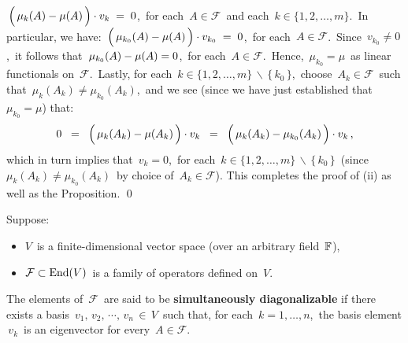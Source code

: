 \begin{enumerate}
    \,$
    \left(\,
            \mu_{k}(A) \overset{{\color{white}.}}{-} \mu(A)
            \,\right)
        \cdot
        v_{k}
    \; = \;
        0
    $,\,
    for each \,$A \in \mathcal{F}$\, and each \,$k \in \{1,2,\ldots,m\}$.\,
    \vskip 0.1cm
    In particular, we have:
    \,$
    \left(\,
            \mu_{k_{0}}(A) \overset{{\color{white}.}}{-} \mu(A)
            \,\right)
        \cdot
        v_{k_{0}}
    \; = \;
        0
    $,\,
    for each \,$A \in \mathcal{F}$.\,
    Since \,$v_{k_{0}} \neq 0$,\, it follows that
    \,$\mu_{k_{0}}(A) \overset{{\color{white}.}}{-} \mu(A) = 0$,\,
    for each \,$A \in \mathcal{F}$.\,
    Hence, \,$\mu_{k_{0}} = \mu$\, as linear functionals on \,$\mathcal{F}$.\,
    \vskip 0.1cm
    Lastly, for each \,$k \in \{1,2,\ldots,m\} \,\backslash\, \{\,k_{0}\,\}$,\,
    choose \,$A_{k} \in \mathcal{F}$\, such that
    \,$\mu_{k}(A_{k}) \neq \mu_{k_{0}}(A_{k})$,\,
    and we see (since we have just established that $\mu_{k_{0}} = \mu$) that:
    \begin{equation*}
    0
    \;\; = \;\;
	    \left(\,
	            \mu_{k}(A_{k}) \overset{{\color{white}.}}{-} \mu(A_{k})
	            \,\right)
	        \cdot
	        v_{k}
    \;\; = \;\;
	    \left(\,
	            \mu_{k}(A_{k}) \overset{{\color{white}.}}{-} \mu_{k_{0}}(A_{k})
	            \,\right)
	        \cdot
	        v_{k}\,,
    \end{equation*}
    which in turn implies that \,$v_{k} = 0$,\,
    for each \,$k \in \{1,2,\ldots,m\} \,\backslash\, \{\,k_{0}\,\}$\,
    (since \,$\mu_{k}(A_{k}) \neq \mu_{k_{0}}(A_{k})$\, by choice of \,$A_{k} \in \mathcal{F}$).
    \vskip 0.2cm
    \noindent
    This completes the proof of (ii) as well as the Proposition.
    \qed
\end{enumerate}


\vskip 0.5cm
\begin{definition}
\mbox{}
\vskip 0.05cm
\noindent
Suppose:
\begin{itemize}
\item
    $V$\, is a finite-dimensional vector space (over an arbitrary field \,$\mathbb{F}$),
\item
    $\mathcal{F} \subset \textnormal{End}(V)$\, is a family of operators defined on \,$V$.
\end{itemize}
The elements of \,$\mathcal{F}$\, are said to be \textbf{simultaneously diagonalizable}
if there exists a basis \,$v_{1},\, v_{2},\, \cdots,\, v_{n} \,\in\, V$\, such that,
for each \,$k = 1, \ldots, n$,\, the basis element
\,$v_{k}$\, is an eigenvector for every \,$A \in \mathcal{F}$.\,
\end{definition}

